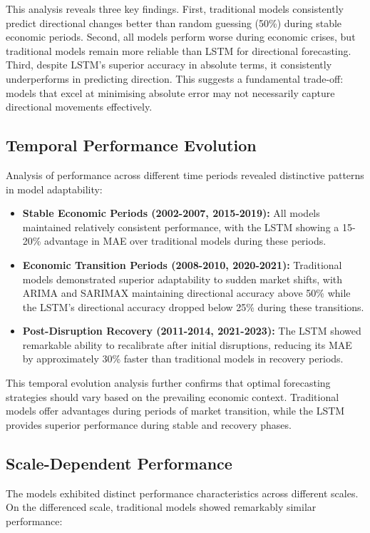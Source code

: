\documentclass[12pt,a4paper]{report}
\begin{document}
This analysis reveals three key findings. First, traditional models consistently predict directional changes better than random guessing (50\%) during stable economic periods. Second, all models perform worse during economic crises, but traditional models remain more reliable than LSTM for directional forecasting. Third, despite LSTM's superior accuracy in absolute terms, it consistently underperforms in predicting direction. This suggests a fundamental trade-off: models that excel at minimising absolute error may not necessarily capture directional movements effectively.

\subsection{Temporal Performance Evolution}
Analysis of performance across different time periods revealed distinctive patterns in model adaptability:

\begin{itemize}
    \item \textbf{Stable Economic Periods (2002-2007, 2015-2019):} All models maintained relatively consistent performance, with the LSTM showing a 15-20\% advantage in MAE over traditional models during these periods.
    
    \item \textbf{Economic Transition Periods (2008-2010, 2020-2021):} Traditional models demonstrated superior adaptability to sudden market shifts, with ARIMA and SARIMAX maintaining directional accuracy above 50\% while the LSTM's directional accuracy dropped below 25\% during these transitions.
    
    \item \textbf{Post-Disruption Recovery (2011-2014, 2021-2023):} The LSTM showed remarkable ability to recalibrate after initial disruptions, reducing its MAE by approximately 30\% faster than traditional models in recovery periods.
\end{itemize}

This temporal evolution analysis further confirms that optimal forecasting strategies should vary based on the prevailing economic context. Traditional models offer advantages during periods of market transition, while the LSTM provides superior performance during stable and recovery phases.

\subsection{Scale-Dependent Performance}
The models exhibited distinct performance characteristics across different scales. On the differenced scale, traditional models showed remarkably similar performance:
\end{document}
